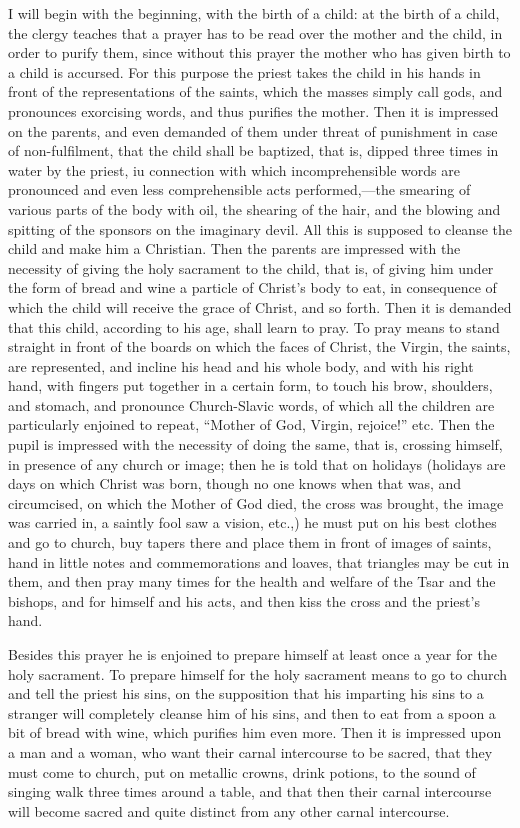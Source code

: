 \documentclass{book}
\begin{document}
I will begin with the beginning, with the birth of a child: at the birth of a child, the clergy teaches that a prayer has to be read over the mother and the child, in order to purify them, since without this prayer the mother who has given birth to a child is accursed. For this purpose the priest takes the child in his hands in front of the representations of the saints, which the masses simply call gods, and pronounces exorcising words, and thus purifies the mother. Then it is impressed on the parents, and even demanded of them under threat of punishment in case of non-fulfilment, that the child shall be baptized, that is, dipped three times in water by the priest, iu connection with which incomprehensible words are pronounced and even less comprehensible acts performed,—the smearing of various parts of the body with oil, the shearing of the hair, and the blowing and spitting of the sponsors on the imaginary devil. All this is supposed to cleanse the child and make him a Christian. Then the parents are impressed with the necessity of giving the holy sacrament to the child, that is, of giving him under the form of bread and wine a particle of Christ’s body to eat, in consequence of which the child will receive the grace of Christ, and so forth. Then it is demanded that this child, according to his age, shall learn to pray. To pray means to stand straight in front of the boards on which the faces of Christ, the Virgin, the saints, are represented, and incline his head and his whole body, and with his right hand, with fingers put together in a certain form, to touch his brow, shoulders, and stomach, and pronounce Church-Slavic words, of which all the children are particularly enjoined to repeat, “Mother of God, Virgin, rejoice!” etc. Then the pupil is impressed with the necessity of doing the same, that is, crossing himself, in presence of any church or image; then he is told that on holidays (holidays are days on which Christ was born, though no one knows when that was, and circumcised, on which the Mother of God died, the cross was brought, the image was carried in, a saintly fool saw a vision, etc.,) he must put on his best clothes and go to church, buy tapers there and place them in front of images of saints, hand in little notes and commemorations and loaves, that triangles may be cut in them, and then pray many times for the health and welfare of the Tsar and the bishops, and for himself and his acts, and then kiss the cross and the priest’s hand.

Besides this prayer he is enjoined to prepare himself at least once a year for the holy sacrament. To prepare himself for the holy sacrament means to go to church and tell the priest his sins, on the supposition that his imparting his sins to a stranger will completely cleanse him of his sins, and then to eat from a spoon a bit of bread with wine, which purifies him even more. Then it is impressed upon a man and a woman, who want their carnal intercourse to be sacred, that they must come to church, put on metallic crowns, drink potions, to the sound of singing walk three times around a table, and that then their carnal intercourse will become sacred and quite distinct from any other carnal intercourse.
\end{document}
